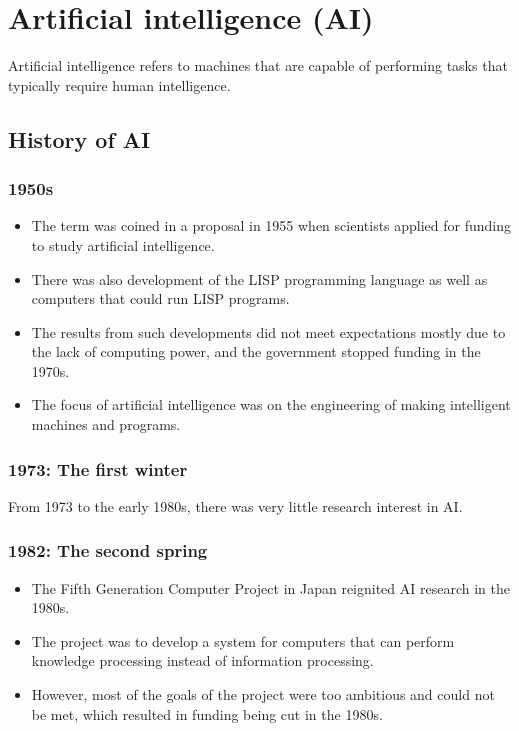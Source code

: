 \documentclass[11pt]{article}
\begin{document}
\clearpage
\section{Artificial intelligence (AI)}
\label{sec:org53e6e3e}
Artificial intelligence refers to machines that are capable of performing tasks that typically require human intelligence.
\subsection{History of AI}
\label{sec:org19c670a}

\subsubsection{1950s}
\label{sec:org0fb95ea}
\begin{itemize}
\item The term was coined in a proposal in 1955 when scientists applied for funding to study artificial intelligence.
\item There was also development of the LISP programming language as well as computers that could run LISP programs.
\item The results from such developments did not meet expectations mostly due to the lack of computing power, and the government stopped funding in the 1970s.
\item The focus of artificial intelligence was on the engineering of making intelligent machines and programs.
\end{itemize}
\subsubsection{1973: The first winter}
\label{sec:org6528716}
From 1973 to the early 1980s, there was very little research interest in AI.
\subsubsection{1982: The second spring}
\label{sec:org7d32e16}
\begin{itemize}
\item The Fifth Generation Computer Project in Japan reignited AI research in the 1980s.
\item The project was to develop a system for computers that can perform knowledge processing instead of information processing.
\item However, most of the goals of the project were too ambitious and could not be met, which resulted in funding being cut in the 1980s.
\end{itemize}
\end{document}
